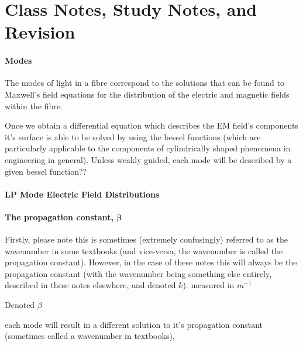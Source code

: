 \documentclass[colorlinks,11pt,a4paper,normalphoto,withhyper,ragged2e]{altareport}
\begin{document}
\section{Class Notes, Study Notes, and Revision}







\paragraph{Modes \linebreak}
The modes of light in a fibre correspond to the solutions that can be found to Maxwell's field equations for the distribution of the electric and magnetic fields within the fibre. \linebreak

Once we obtain a differential equation which describes the EM field's components it's surface is able to be solved by using the bessel functions (which are particularly applicable to the components of cylindrically shaped phenomena in engineering in general). Unless weakly guided, each mode will be described by a given bessel function??





\paragraph{LP Mode Electric Field Distributions \linebreak}





\paragraph{The propagation constant, $\boldsymbol{\beta}$ \linebreak}
Firstly, please note this is sometimes (extremely confusingly) referred to as the wavenumber in some textbooks (and vice-versa, the wavenumber is called the propagation constant). However, in the case of these notes this will always be the propagation constant (with the wavenumber being something else entirely, described in these notes elsewhere, and denoted $k$). measured in $m^{-1}$

Denoted $\beta$ 

each mode will result in a different solution to it's propagation constant (sometimes called a wavenumber in textbooks), 
\end{document}

